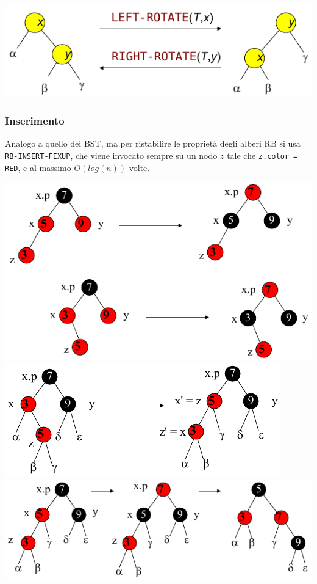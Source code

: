 \documentclass[10pt,a4paper]{article}
\newcommand{\code}{\texttt}
\begin{document}
\begin{multicols*}{2}
\centering
\vspace{1em}
\includegraphics[width=\linewidth, scale=0.9]{rb_rotations.png}
\justifying

\subsubsection*{Inserimento}
Analogo a quello dei BST, ma per ristabilire le proprietà degli alberi RB si usa \code{RB-INSERT-FIXUP}, che viene invocato sempre su un nodo $z$ tale che \code{z.color = RED}, e al massimo $O(log(n))$ volte.

\centering
\vspace{1em}
\includegraphics[width=\linewidth, scale=0.9]{rb_insert_fixup_1.png}
\vspace{1em}
\includegraphics[width=\linewidth, scale=0.9]{rb_insert_fixup_2.png}
\vspace{1em}
\includegraphics[width=\linewidth, scale=0.9]{rb_insert_fixup_3.png}
\justifying


\end{multicols*}
\end{document}
